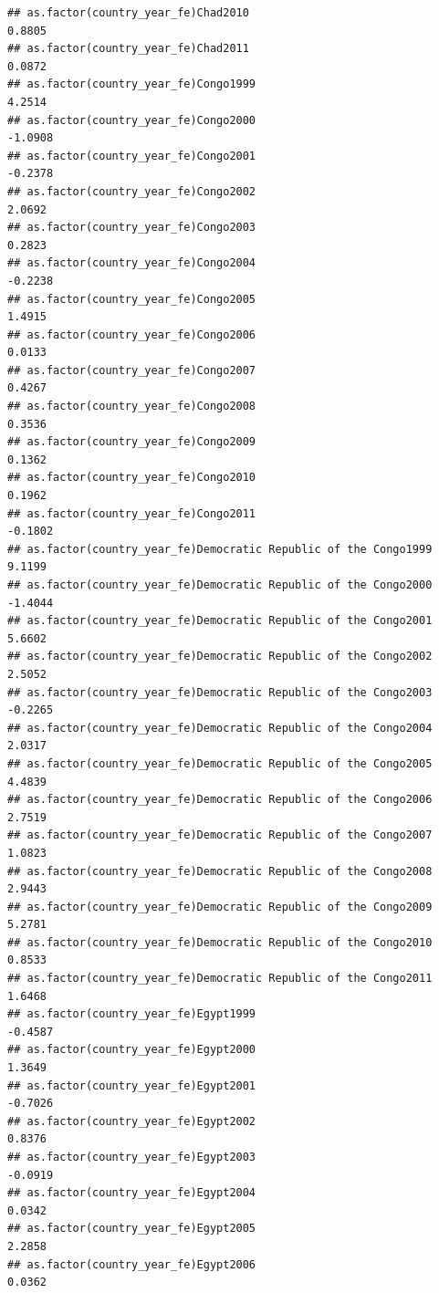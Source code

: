 \documentclass[
  a4paper,
]{article}
\begin{document}
\begin{verbatim}
## as.factor(country_year_fe)Chad2010                              0.8805
## as.factor(country_year_fe)Chad2011                              0.0872
## as.factor(country_year_fe)Congo1999                             4.2514
## as.factor(country_year_fe)Congo2000                            -1.0908
## as.factor(country_year_fe)Congo2001                            -0.2378
## as.factor(country_year_fe)Congo2002                             2.0692
## as.factor(country_year_fe)Congo2003                             0.2823
## as.factor(country_year_fe)Congo2004                            -0.2238
## as.factor(country_year_fe)Congo2005                             1.4915
## as.factor(country_year_fe)Congo2006                             0.0133
## as.factor(country_year_fe)Congo2007                             0.4267
## as.factor(country_year_fe)Congo2008                             0.3536
## as.factor(country_year_fe)Congo2009                             0.1362
## as.factor(country_year_fe)Congo2010                             0.1962
## as.factor(country_year_fe)Congo2011                            -0.1802
## as.factor(country_year_fe)Democratic Republic of the Congo1999  9.1199
## as.factor(country_year_fe)Democratic Republic of the Congo2000 -1.4044
## as.factor(country_year_fe)Democratic Republic of the Congo2001  5.6602
## as.factor(country_year_fe)Democratic Republic of the Congo2002  2.5052
## as.factor(country_year_fe)Democratic Republic of the Congo2003 -0.2265
## as.factor(country_year_fe)Democratic Republic of the Congo2004  2.0317
## as.factor(country_year_fe)Democratic Republic of the Congo2005  4.4839
## as.factor(country_year_fe)Democratic Republic of the Congo2006  2.7519
## as.factor(country_year_fe)Democratic Republic of the Congo2007  1.0823
## as.factor(country_year_fe)Democratic Republic of the Congo2008  2.9443
## as.factor(country_year_fe)Democratic Republic of the Congo2009  5.2781
## as.factor(country_year_fe)Democratic Republic of the Congo2010  0.8533
## as.factor(country_year_fe)Democratic Republic of the Congo2011  1.6468
## as.factor(country_year_fe)Egypt1999                            -0.4587
## as.factor(country_year_fe)Egypt2000                             1.3649
## as.factor(country_year_fe)Egypt2001                            -0.7026
## as.factor(country_year_fe)Egypt2002                             0.8376
## as.factor(country_year_fe)Egypt2003                            -0.0919
## as.factor(country_year_fe)Egypt2004                             0.0342
## as.factor(country_year_fe)Egypt2005                             2.2858
## as.factor(country_year_fe)Egypt2006                             0.0362

\end{verbatim}
\end{document}
